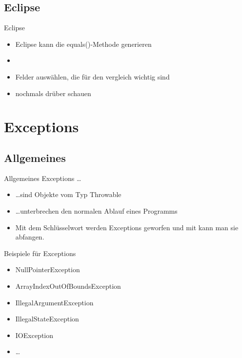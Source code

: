 \documentclass[usepdftitle=false,hyperref={pdfpagelabels=false}]{beamer}
\begin{document}
\subsection{Eclipse}
\begin{frame}{Eclipse}
    \begin{itemize}
        \item Eclipse kann die equals()-Methode generieren
        \item {}
        \item Felder auswählen, die für den vergleich wichtig sind
        \item nochmals drüber schauen
    \end{itemize}
\end{frame}

\section{Exceptions}
\subsection{Allgemeines}
\begin{frame}{Allgemeines}
    Exceptions \dots
    \begin{itemize}[<+->]
        \item \dots sind Objekte vom Typ Throwable
        \item \dots unterbrechen den normalen Ablauf eines Programms
        \item Mit dem Schlüsselwort  werden Exceptions 
              geworfen und mit  kann man sie abfangen.
    \end{itemize}

    \pause[\thebeamerpauses]

    \begin{exampleblock}{Beispiele für Exceptions}
        \begin{itemize}
            \item NullPointerException
            \item ArrayIndexOutOfBoundsException
            \item IllegalArgumentException
            \item IllegalStateException
            \item IOException
            \item \dots
        \end{itemize}
    \end{exampleblock}
\end{frame}
\end{document}
